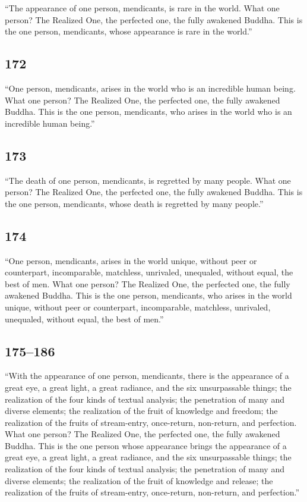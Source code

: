 \documentclass[12pt,openany]{book}%
\begin{document}
“The appearance of one person, mendicants, is rare in the world. What one person? The Realized One, the perfected one, the fully awakened Buddha. This is the one person, mendicants, whose appearance is rare in the world.” 

\subsection*{172 }

“One person, mendicants, arises in the world who is an incredible human being. What one person? The Realized One, the perfected one, the fully awakened Buddha. This is the one person, mendicants, who arises in the world who is an incredible human being.” 

\subsection*{173 }

“The death of one person, mendicants, is regretted by many people. What one person? The Realized One, the perfected one, the fully awakened Buddha. This is the one person, mendicants, whose death is regretted by many people.” 

\subsection*{174 }

“One person, mendicants, arises in the world unique, without peer or counterpart, incomparable, matchless, unrivaled, unequaled, without equal, the best of men. What one person? The Realized One, the perfected one, the fully awakened Buddha. This is the one person, mendicants, who arises in the world unique, without peer or counterpart, incomparable, matchless, unrivaled, unequaled, without equal, the best of men.” 

\subsection*{175–186 }

“With the appearance of one person, mendicants, there is the appearance of a great eye, a great light, a great radiance, and the six unsurpassable things; the realization of the four kinds of textual analysis; the penetration of many and diverse elements; the realization of the fruit of knowledge and freedom; the realization of the fruits of stream-entry, once-return, non-return, and perfection. What one person? The Realized One, the perfected one, the fully awakened Buddha. This is the one person whose appearance brings the appearance of a great eye, a great light, a great radiance, and the six unsurpassable things; the realization of the four kinds of textual analysis; the penetration of many and diverse elements; the realization of the fruit of knowledge and release; the realization of the fruits of stream-entry, once-return, non-return, and perfection.” 
\end{document}

